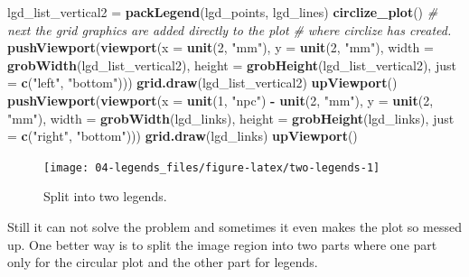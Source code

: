 \documentclass[]{book}
\newenvironment{Shaded}{\begin{snugshade}}{\end{snugshade}}
\newcommand{\KeywordTok}[1]{\textcolor[rgb]{0.13,0.29,0.53}{\textbf{#1}}}
\newcommand{\DataTypeTok}[1]{\textcolor[rgb]{0.13,0.29,0.53}{#1}}
\newcommand{\DecValTok}[1]{\textcolor[rgb]{0.00,0.00,0.81}{#1}}
\newcommand{\StringTok}[1]{\textcolor[rgb]{0.31,0.60,0.02}{#1}}
\newcommand{\CommentTok}[1]{\textcolor[rgb]{0.56,0.35,0.01}{\textit{#1}}}
\newcommand{\OperatorTok}[1]{\textcolor[rgb]{0.81,0.36,0.00}{\textbf{#1}}}
\newcommand{\NormalTok}[1]{#1}
\theoremstyle{definition}
\theoremstyle{definition}
\theoremstyle{remark}
\begin{document}
\begin{Shaded}
\begin{Highlighting}[]
\NormalTok{lgd_list_vertical2 =}\StringTok{ }\KeywordTok{packLegend}\NormalTok{(lgd_points, lgd_lines)}
\KeywordTok{circlize_plot}\NormalTok{()}
\CommentTok{# next the grid graphics are added directly to the plot}
\CommentTok{# where circlize has created.}
\KeywordTok{pushViewport}\NormalTok{(}\KeywordTok{viewport}\NormalTok{(}\DataTypeTok{x =} \KeywordTok{unit}\NormalTok{(}\DecValTok{2}\NormalTok{, }\StringTok{"mm"}\NormalTok{), }\DataTypeTok{y =} \KeywordTok{unit}\NormalTok{(}\DecValTok{2}\NormalTok{, }\StringTok{"mm"}\NormalTok{), }
    \DataTypeTok{width =} \KeywordTok{grobWidth}\NormalTok{(lgd_list_vertical2), }
    \DataTypeTok{height =} \KeywordTok{grobHeight}\NormalTok{(lgd_list_vertical2), }
    \DataTypeTok{just =} \KeywordTok{c}\NormalTok{(}\StringTok{"left"}\NormalTok{, }\StringTok{"bottom"}\NormalTok{)))}
\KeywordTok{grid.draw}\NormalTok{(lgd_list_vertical2)}
\KeywordTok{upViewport}\NormalTok{()}
\KeywordTok{pushViewport}\NormalTok{(}\KeywordTok{viewport}\NormalTok{(}\DataTypeTok{x =} \KeywordTok{unit}\NormalTok{(}\DecValTok{1}\NormalTok{, }\StringTok{"npc"}\NormalTok{) }\OperatorTok{-}\StringTok{ }\KeywordTok{unit}\NormalTok{(}\DecValTok{2}\NormalTok{, }\StringTok{"mm"}\NormalTok{), }\DataTypeTok{y =} \KeywordTok{unit}\NormalTok{(}\DecValTok{2}\NormalTok{, }\StringTok{"mm"}\NormalTok{), }
    \DataTypeTok{width =} \KeywordTok{grobWidth}\NormalTok{(lgd_links), }
    \DataTypeTok{height =} \KeywordTok{grobHeight}\NormalTok{(lgd_links), }
    \DataTypeTok{just =} \KeywordTok{c}\NormalTok{(}\StringTok{"right"}\NormalTok{, }\StringTok{"bottom"}\NormalTok{)))}
\KeywordTok{grid.draw}\NormalTok{(lgd_links)}
\KeywordTok{upViewport}\NormalTok{()}
\end{Highlighting}
\end{Shaded}

\begin{figure}

{\centering \texttt{[image: 04-legends\_files/figure-latex/two-legends-1]} 

}

\caption{Split into two legends.}\label{fig:two-legends}
\end{figure}

Still it can not solve the problem and sometimes it even makes the plot
so messed up. One better way is to split the image region into two parts
where one part only for the circular plot and the other part for
legends.
\end{document}
